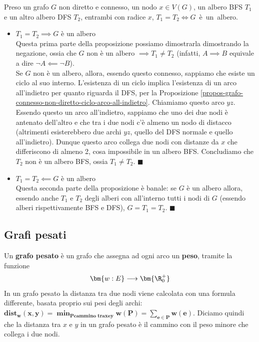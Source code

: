 \documentclass[11pt, a4paper, titlepage, oneside]{scrbook}
\begin{document}
\begin{Proposizione}[]
\label{propos-alberi-BFS-DFS}
Preso un grafo $G$ non diretto e connesso, un nodo $x \in V(G)$, un albero BFS $T_1$ e un altro albero DFS $T_2$, entrambi con radice $x$, \mbox{$T_1 = T_2 \iff G$ è un albero}.
\end{Proposizione}

\Dimostrazione \nopagebreak

\begin{itemize}
    \item $T_1 = T_2 \implies G$ è un albero \\
    Questa prima parte della proposizione possiamo dimostrarla dimostrando la negazione, ossia che $G$ non è un albero $\implies T_1 \neq T_2$ (infatti, $A \implies B$ equivale a dire $\neg A \impliedby \neg B$). \\
    Se $G$ non è un albero, allora, essendo questo connesso, sappiamo che esiste un ciclo al suo interno. L'esistenza di un ciclo implica l'esistenza di un arco all'indietro per quanto riguarda il DFS, per la Proposizione \ref{propos-grafo-connesso-non-diretto-ciclo-arco-all-indietro}. Chiamiamo questo arco $yz$. Essendo questo un arco all'indietro, sappiamo che uno dei due nodi è antenato dell'altro e che tra i due nodi c'è almeno un nodo di distacco (altrimenti esisterebbero due archi $yz$, quello del DFS normale e quello all'indietro). Dunque questo arco collega due nodi con distanze da $x$ che differiscono di almeno 2, cosa impossibile in un albero BFS. Concludiamo che $T_2$ non è un albero BFS, ossia $T_1 \neq T_2$. $\blacksquare$
    \item $T_1 = T_2 \impliedby G$ è un albero \\
    Questa seconda parte della proposizione è banale: se $G$ è un albero allora, essendo anche $T_1$ e $T_2$ degli alberi con all'interno tutti i nodi di $G$ (essendo alberi rispettivamente BFS e DFS), $G = T_1 = T_2$. $\blacksquare$
\end{itemize}

\subsection{Grafi pesati}

\begin{Definizione}
\label{def-grafo-pesato}
Un \textbf{grafo pesato} è un grafo che assegna ad ogni arco un \textbf{peso}, tramite la funzione
\[
\bm{w: E} \longrightarrow \bm{\R^+_0}
\]
In un grafo pesato la distanza tra due nodi viene calcolata con una formula differente, basata proprio sui pesi degli archi: $\bm{dist_w(x,y) = \min_{P \textbf{cammino tra} x \text{e} y} w(P) = \sum_{e \in P} w(e)}$. Diciamo quindi che la distanza tra $x$ e $y$ in un grafo pesato è il cammino con il peso minore che collega i due nodi.
\end{Definizione}
\end{document}
